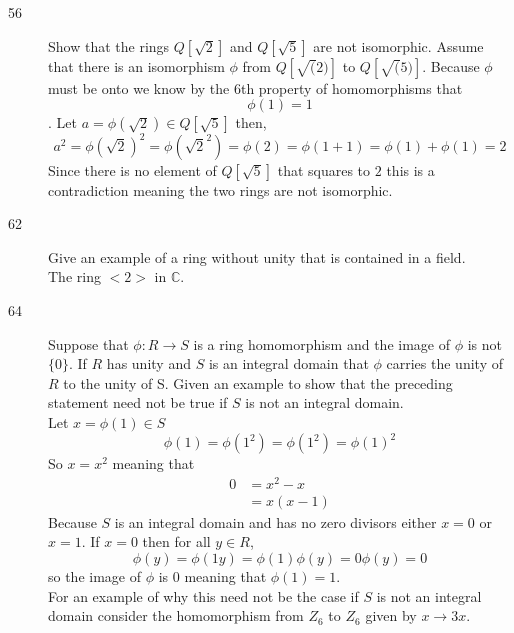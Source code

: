 \documentclass[11pt]{article}
\newcommand{\C}{\mathbb{C}}
\begin{document}
\begin{description}
	\item[56] Show that the rings $Q[\sqrt2]$ and $Q[\sqrt5]$ are not
		isomorphic.
		Assume that there is an isomorphism $\phi$ from $Q[\sqrt(2)]$ to
		$Q[\sqrt(5)]$.
		Because $\phi$ must be onto we know by the 6th property of homomorphisms that
		$$ \phi(1) = 1$$.
		Let $a = \phi(\sqrt2) \in Q[\sqrt5]$ then,
		$$a^2 = \phi(\sqrt2)^2 = \phi(\sqrt2^2) = 
		\phi(2)  = \phi(1 + 1) = \phi(1) + \phi(1) = 2 $$
		Since there is no element of $Q[\sqrt5]$ that squares to $2$ this is a
		contradiction meaning the two rings are not isomorphic.
	\item[62] Give an example of a ring without unity that is contained in a
		field.\\
		The ring $<2>$ in $\C$. 
	\item[64] Suppose that $\phi : R \rightarrow S$ is a ring homomorphism
		and the image of $\phi$ is not $\{0\}$. If $R$ has unity and $S$
		is an integral domain that $\phi$ carries the unity of $R$ to
		the unity of S. Given an example to show that the preceding
		statement need not be true if $S$ is not an integral domain.\\
		Let $x = \phi(1) \in S$
		$$\phi(1) = \phi(1^2) = \phi(1^2) = \phi(1)^2$$
		So $x = x^2$ meaning that
		\begin{align*}
			0 & = x^2 - x \\
			  & = x(x-1)
		\end{align*}
		Because $S$ is an integral domain and has no zero divisors
		either $x = 0$ or $x = 1$.
		If $ x = 0$ then for all $y \in R$, 
		$$ \phi(y) = \phi(1y) = \phi(1)\phi(y) = 0\phi(y) = 0 $$ so the
		image of $\phi$ is ${0}$ meaning that $\phi(1) = 1$.\\
		For an example of why this need not be the case if $S$ is not an
		integral domain consider the homomorphism from $Z_6$ to $Z_6$
		given by  $x \rightarrow 3x$. 



\end{description}
\end{document}
